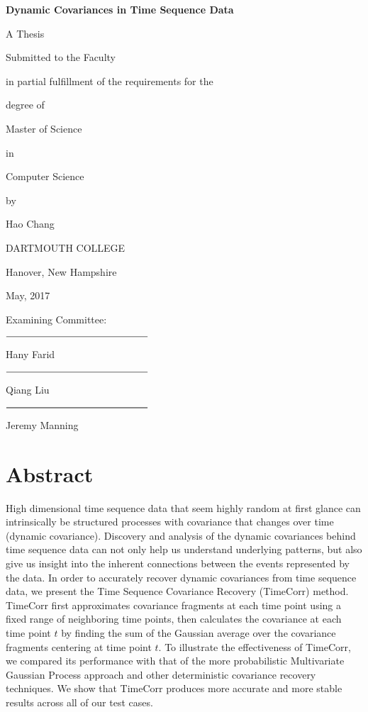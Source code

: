 \documentclass[12pt]{article}
\begin{document}
{\centering
  \textbf{Dynamic Covariances in Time Sequence Data}\par
  A Thesis\par
  Submitted to the Faculty\par
  in partial fulfillment of the requirements for the\par
  degree of\par
  Master of Science\par
  in\par
  Computer Science\par
  by\par
  Hao Chang\par
  DARTMOUTH COLLEGE\par
  Hanover, New Hampshire\par
  May, 2017\par
}
\vspace{5mm}
\setlength{\parskip}{0em}
\begin{flushright}
Examining Committee:\par
\vspace{5mm}
$\rule{5cm}{0.15mm}$\par
Hany Farid\par
\vspace{5mm}
$\rule{5cm}{0.15mm}$\par
Qiang Liu\par
\vspace{5mm}
$\rule{5cm}{0.25mm}$\par
Jeremy Manning\par
\end{flushright}
\setlength{\parskip}{1em}




\newpage
\null\par
\newpage






\section{Abstract}
High dimensional time sequence data that seem highly random at first glance can intrinsically be structured processes with covariance that changes over time (dynamic covariance). Discovery and analysis of the dynamic covariances behind time sequence data can not only help us understand underlying patterns, but also give us insight into the inherent connections between the events represented by the data. In order to accurately recover dynamic covariances from time sequence data, we present the Time Sequence Covariance Recovery (TimeCorr) method. TimeCorr first approximates covariance fragments at each time point using a fixed range of neighboring time points, then calculates the covariance at each time point $t$ by finding the sum of the Gaussian average over the covariance fragments centering at time point $t$. To illustrate the effectiveness of TimeCorr, we compared its performance with that of the more probabilistic Multivariate Gaussian Process approach and other deterministic covariance recovery techniques. We show that TimeCorr produces more accurate and more stable results across all of our test cases.
\newpage
\end{document}
